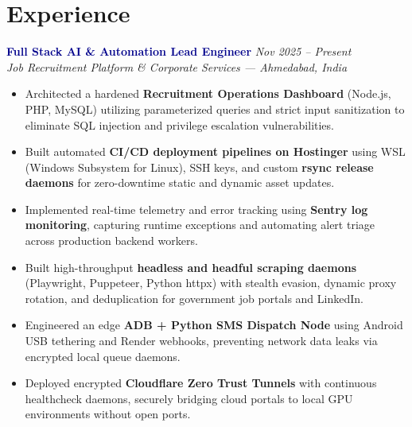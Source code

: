 \documentclass[10.5pt]{article}
\begin{document}
\section*{Experience}

\noindent\textbf{\textcolor{darkblue}{Full Stack AI \& Automation Lead Engineer}} \hfill \textit{\small\color{medgray}Nov 2025 -- Present}\\
{\small\color{accentblue}\textit{Job Recruitment Platform \& Corporate Services --- Ahmedabad, India}}
\begin{itemize}
\item Architected a hardened \textbf{Recruitment Operations Dashboard} (Node.js, PHP, MySQL) utilizing parameterized queries and strict input sanitization to eliminate SQL injection and privilege escalation vulnerabilities.
\item Built automated \textbf{CI/CD deployment pipelines on Hostinger} using WSL (Windows Subsystem for Linux), SSH keys, and custom \textbf{rsync release daemons} for zero-downtime static and dynamic asset updates.
\item Implemented real-time telemetry and error tracking using \textbf{Sentry log monitoring}, capturing runtime exceptions and automating alert triage across production backend workers.
\item Built high-throughput \textbf{headless and headful scraping daemons} (Playwright, Puppeteer, Python httpx) with stealth evasion, dynamic proxy rotation, and deduplication for government job portals and LinkedIn.
\item Engineered an edge \textbf{ADB + Python SMS Dispatch Node} using Android USB tethering and Render webhooks, preventing network data leaks via encrypted local queue daemons.
\item Deployed encrypted \textbf{Cloudflare Zero Trust Tunnels} with continuous healthcheck daemons, securely bridging cloud portals to local GPU environments without open ports.
\end{itemize}
\end{document}
